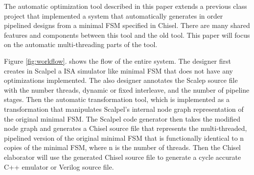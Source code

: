 The automatic optimization tool described in this paper extends a previous class project that implemented a system that automatically generates in order pipelined designs from a minimal FSM specified in Chisel. There are many shared features and components between this tool and the old tool. This paper will focus on the automatic multi-threading parts of the tool.

Figure \ref{fig:workflow}. shows the flow of the entire system. The designer first creates in Scalpel a ISA simulator like minimal FSM that does not have any optimizations implemented. The also designer annotates the Scalep source file with the number threads, dynamic or fixed interleave, and the number of pipeline stages. Then the automatic transformation tool, which is implemented as a transformation that manipulates Scalpel's internal node graph representation of the original minimal FSM. The Scalpel code generator then takes the modified node graph and generates a Chisel source file that represents the multi-threaded, pipelined version of the original minimal FSM that is functionally identical to n copies of the minimal FSM, where n is the number of threads. Then the Chisel elaborator will use the generated Chisel source file to generate a cycle accurate C++ emulator or Verilog source file.
